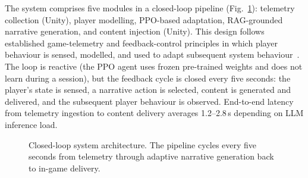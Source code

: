\documentclass[conference]{IEEEtran}
\begin{document}
The system comprises five modules in a closed-loop pipeline (Fig.~\ref{fig:architecture}): telemetry collection (Unity), player modelling, PPO-based adaptation, RAG-grounded narrative generation, and content injection (Unity). This design follows established game-telemetry and feedback-control principles in which player behaviour is sensed, modelled, and used to adapt subsequent system behaviour~\cite{drachen2013game, sutton2018reinforcement}. The loop is reactive (the PPO agent uses frozen pre-trained weights and does not learn during a session), but the feedback cycle is closed every five seconds: the player's state is sensed, a narrative action is selected, content is generated and delivered, and the subsequent player behaviour is observed. End-to-end latency from telemetry ingestion to content delivery averages 1.2--2.8\,s depending on LLM inference load.

\begin{figure}[htbp]
\centering
{}
\caption{Closed-loop system architecture. The pipeline cycles every five seconds from telemetry through adaptive narrative generation back to in-game delivery.}
\label{fig:architecture}
\end{figure}
\end{document}
